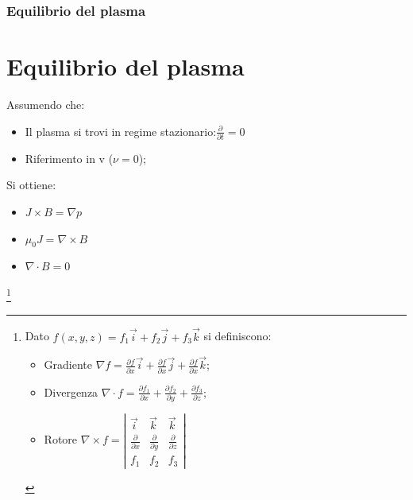 \documentclass{beamer}
\begin{document}
\begin{frame}
	\frametitle{Equilibrio del plasma}
	\section{Equilibrio del plasma}
	Assumendo che:
	\begin{itemize}
		\item Il plasma si trovi in regime stazionario:\( \frac{\partial}{\partial t}=0\)
		\item Riferimento in v (\(\nu=0\));
	\end{itemize}
	Si ottiene:
	\begin{itemize}
		\item \(J\times B=\nabla p\)
		\item \(\mu_{0}J=\nabla\times B\)
		\item \(\nabla\cdot B=0\)
	\end{itemize}
\footnote{
	Dato \(f(x,y,z)=f_{1}\overrightarrow{i}+f_{2}\overrightarrow{j}+f_{3}\overrightarrow{k}\) si definiscono:
	\begin{itemize}
		\item Gradiente  \(\nabla f = \frac{\partial f}{\partial x}\overrightarrow{i}+\frac{\partial f}{\partial x}\overrightarrow{j}+\frac{\partial f}{\partial x}\overrightarrow{k} \);
		\item Divergenza \(\nabla\cdot f=\frac{\partial f_{1}}{\partial x}+\frac{\partial f_{2}}{\partial y}+\frac{\partial f_{3}}{\partial z}\);
		\item Rotore \(\nabla\times f=\left\lvert \begin{matrix}
			\overrightarrow{i}&\overrightarrow{k}&\overrightarrow{k}\\
			\frac{\partial}{\partial x}& \frac{\partial}{\partial y}&\frac{\partial}{\partial z}\\
			f_{1}&f_{2}&f_{3}
		\end{matrix}\right\rvert \)
	\end{itemize}
}
\end{frame}
\end{document}
